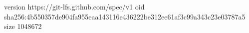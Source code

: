 version https://git-lfs.github.com/spec/v1
oid sha256:4b550357de904fa955eaa143116e436222be312ee61af3c99a343c23e03787a5
size 1048672
